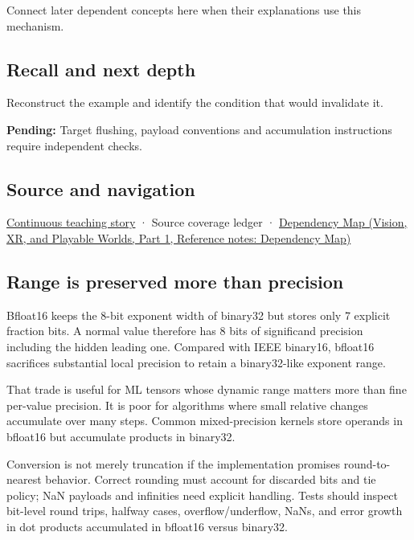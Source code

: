 Connect later dependent concepts here when their explanations use this mechanism.

\subsection{Recall and next depth}\label{appendix-18b8dd966b5d-recall-and-next-depth}

\hypertarget{appendix-18b8dd966b5d-recall-and-next-depth}{}

Reconstruct the example and identify the condition that would invalidate it.

\textbf{Pending:} Target flushing, payload conventions and accumulation instructions require independent checks.

\subsection{Source and navigation}\label{appendix-18b8dd966b5d-source-and-navigation}

\hypertarget{appendix-18b8dd966b5d-source-and-navigation}{}

\hyperref[01-foundations-i-ch001-choosing-what-information-to-keep]{Continuous teaching story} · {Source coverage ledger} · \href{../07-Vision-XR-and-Playable-Worlds-P01/main.pdf\#nameddest=appendix-4ad47bdd269a}{Dependency Map (Vision, XR, and Playable Worlds, Part 1, Reference notes: Dependency Map)}

\subsection{Range is preserved more than precision}\label{appendix-18b8dd966b5d-range-is-preserved-more-than-precision}

\hypertarget{appendix-18b8dd966b5d-range-is-preserved-more-than-precision}{}

Bfloat16 keeps the 8-bit exponent width of binary32 but stores only 7 explicit fraction bits. A normal value therefore has 8 bits of significand precision including the hidden leading one. Compared with IEEE binary16, bfloat16 sacrifices substantial local precision to retain a binary32-like exponent range.

That trade is useful for ML tensors whose dynamic range matters more than fine per-value precision. It is poor for algorithms where small relative changes accumulate over many steps. Common mixed-precision kernels store operands in bfloat16 but accumulate products in binary32.

Conversion is not merely truncation if the implementation promises round-to-nearest behavior. Correct rounding must account for discarded bits and tie policy; NaN payloads and infinities need explicit handling. Tests should inspect bit-level round trips, halfway cases, overflow/underflow, NaNs, and error growth in dot products accumulated in bfloat16 versus binary32.
